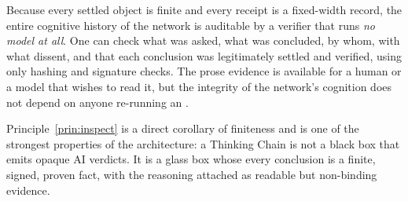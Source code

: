 \begin{principle}
\label{prin:inspect}
Because every settled object is finite and every receipt is a fixed-width record, the entire cognitive history of the network is auditable by a verifier that runs \emph{no model at all}. One can check what was asked, what was concluded, by whom, with what dissent, and that each conclusion was legitimately settled and verified, using only hashing and signature checks. The prose evidence is available for a human or a model that wishes to read it, but the integrity of the network's cognition does not depend on anyone re-running an \LLM{}.
\end{principle}

Principle~\ref{prin:inspect} is a direct corollary of finiteness and is one of the strongest properties of the architecture: a Thinking Chain is not a black box that emits opaque AI verdicts. It is a glass box whose every conclusion is a finite, signed, proven fact, with the reasoning attached as readable but non-binding evidence.

